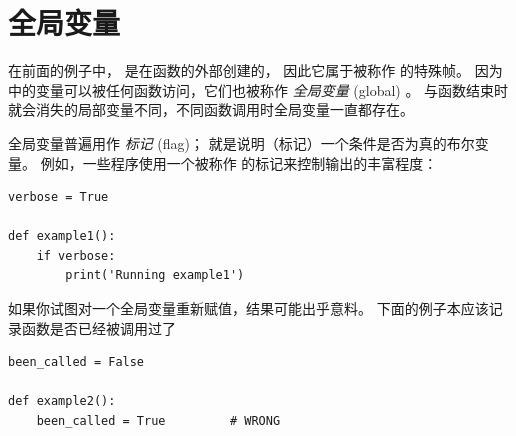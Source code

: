 \section{全局变量}

  


在前面的例子中， 是在函数的外部创建的，
因此它属于被称作  的特殊帧。
因为  中的变量可以被任何函数访问，它们也被称作 {\em 全局变量} (global) 。 与函数结束时就会消失的局部变量不同，不同函数调用时全局变量一直都存在。



全局变量普遍用作 {\em 标记} (flag)； 就是说明（标记）一个条件是否为真的布尔变量。
例如，一些程序使用一个被称作  的标记来控制输出的丰富程度：

\begin{lstlisting}
verbose = True

def example1():
    if verbose:
        print('Running example1')
\end{lstlisting}

%

如果你试图对一个全局变量重新赋值，结果可能出乎意料。
下面的例子本应该记录函数是否已经被调用过了


\begin{lstlisting}
been_called = False

def example2():
    been_called = True         # WRONG
\end{lstlisting}

%


